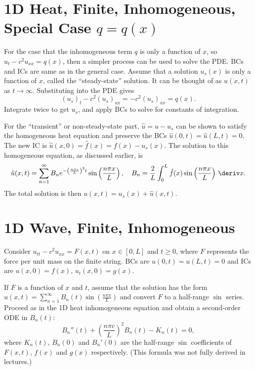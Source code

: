 \documentclass[10pt, a4paper]{article}
\begin{document}
\begin{landscape}
\pagebreak

\begin{multicols*}{2}

    \section{1D Heat, Finite, Inhomogeneous, Special Case \texorpdfstring{\(q = q(x)\)}{q = q(x)}}

    For the case that the inhomogeneous term \(q\) is only a function of \(x\), so \(u_{t} - c^{2} u_{xx} = q(x)\),
    then a simpler process can be used to solve the PDE. BCs and ICs are same as in the general case.
    Assume that a solution \(u_{s}(x)\) is only a function of \(x\),
    called the ``steady-state'' solution. It can be thought of as \(u(x, t)\) as \(t \to \infty\). Substituting into the
    PDE gives
    \[
        (u_{s})_t - c^{2} (u_{s})_{xx} = -c^{2} (u_{s})_{xx} = q(x).
    \]
    Integrate twice to get \(u_{s}\), and apply BCs to solve for constants of integration.

    For the ``transient'' or non-steady-state part, \(\hat u = u - u_s\) can be shown to satisfy the
    homogeneous heat equation and preserve the BCs \(\hat u(0, t) = \hat u(L, t) = 0\).
    The new IC is \(\hat u(x, 0) = \hat f(x) = f(x) - u_s(x)\). The solution to this homogeneous equation,
    as discussed earlier, is
    \[
        \hat u(x, t) 
        = \sum_{n=1}^{\infty} B_n 
            e^{-\left(\frac{n \pi c}{L}\right)^2 t}
            \sin \left(\frac{n \pi x}{L}\right),
        \quad
        B_n = \frac{2}{L} \int_0^L \hat f(x) \sin \left(\frac{n \pi x}{L}\right) \,\deriv x.
    \]
    The total solution is then \(u(x, t) = u_s(x) + \hat u(x, t)\).

    \section{1D Wave, Finite, Inhomogeneous}

    Consider \(u_{tt} - c^2 u_{xx} = F(x, t)\) on \(x \in [0, L]\) and \(t \geq 0\), where \(F\) represents
    the force per unit mass on the finite string. BCs are \(u(0, t) = u(L, t) = 0\) and ICs are
    \(u(x, 0) = f(x)\), \(u_t(x, 0) = g(x)\).

    If \(F\) is a function of \(x\) and \(t\), assume that the solution has the form
    \(u(x, t) = \sum_{n=1}^{\infty} B_n(t) \sin\left(\frac{n \pi x}{L}\right)\) and convert \(F\) to a half-range
    \(\sin\) series. Proceed as in the 1D heat inhomogeneous equation and obtain a second-order ODE in \(B_n(t)\):
    \[
        B_n''(t) + \left(\frac{n \pi c}{L}\right)^2 B_n(t) - K_n(t) = 0,
    \]
    where \(K_n(t)\), \(B_n(0)\) and \(B_n'(0)\) are the half-range \(\sin\) coefficients of
    \(F(x, t)\), \(f(x)\) and \(g(x)\) respectively. (This formula was not fully derived in lectures.)
    

\end{multicols*}
\end{landscape}
\end{document}
